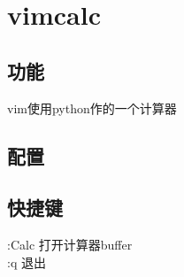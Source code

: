\chapter{vimcalc}

\section{功能}
vim使用python作的一个计算器

\section{配置}

\section{快捷键}
:Calc 打开计算器buffer\\
:q 退出

\newpage
